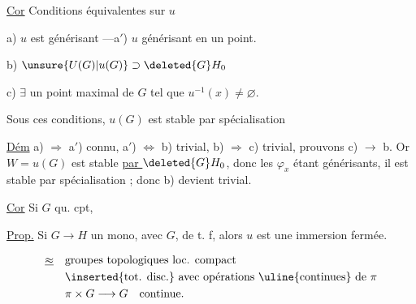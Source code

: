 \uline{Cor} Conditions équivalentes sur $u$

 a) $u$ est  générisant \quad---\quad a$'$) $u$ générisant en un point.

b) $\unsure{U(G)|u(G)}\supset \deleted{G}H_0$

c) $\exists$ un point maximal  de $G$ tel que $u^{-1}(x)\ne\varnothing$.

Sous ces conditions, $u(G)$ est stable par spécialisation 

\uline{Dém} a) $\Longrightarrow$ a$'$) connu, a$'$) $\Longleftrightarrow$ b)  trivial, b) $\Longrightarrow$ c) trivial, prouvons c) $\longrightarrow$ b. Or $W=u(G)$ est stable \uline{par $\deleted{G}H_0$}, donc les $\varphi_x$ étant générisants, il est stable par spécialisation ;  donc b) devient trivial.

\uline{Cor} Si $G$ qu. cpt,  

\uline{Prop.} Si $G\longrightarrow H$ un mono, avec $G$,  de t. f,  alors $u$ est une immersion fermée.



\[
\begin{aligned}
\underline{\approx}\quad &\text{groupes topologiques loc. compact}\\
 &\text{\inserted{tot. disc.} avec opérations \uline{continues} de }\pi\\
 &\pi\times G\longrightarrow G\quad\text{continue.}
\end{aligned}
\]

